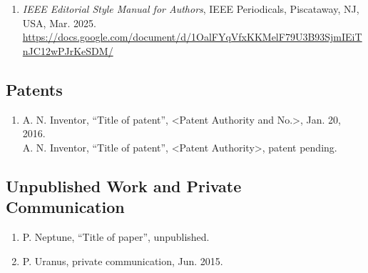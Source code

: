 \documentclass[%
               hyphens,       %
               ]{jacow}
\begin{document}
\begin{enumerate}[leftmargin=22pt, resume*]
	\item \textit{IEEE Editorial Style Manual for Authors},
		IEEE Periodicals, Piscataway,
		NJ, USA, Mar. 2025. \\
		\url{https://docs.google.com/document/d/1OalFYqVfxKKMelF79U3B93SjmIEiTnJC12wPJrKeSDM/}
\end{enumerate}

\subsection{Patents}

\begin{enumerate}[leftmargin=22pt, resume*]
	\item  A. N. Inventor, “Title of patent”, 
		<Patent Authority and No.>, Jan. 20, 2016. \\[3pt]
		A. N. Inventor, “Title of patent”, 
		<Patent Authority>, patent pending.

\end{enumerate}

\subsection{Unpublished Work and Private Communication}

\begin{enumerate}[leftmargin=22pt, resume*]
	\item P. Neptune, “Title of paper”, unpublished.
	
	\item P. Uranus, private communication, Jun. 2015.
\end{enumerate}
\end{document}
